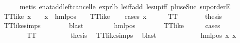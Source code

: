 \begin{isabellebody}
\ \ \ \ \isamarkupfalse%
\ {\isacharparenleft}{\kern0pt}metis\ enat{\isacharunderscore}{\kern0pt}add{\isacharunderscore}{\kern0pt}left{\isacharunderscore}{\kern0pt}cancel{\isacharunderscore}{\kern0pt}le\ expr{\isacharunderscore}{\kern0pt}{}{\isacharunderscore}{\kern0pt}lb\ le{\isacharunderscore}{\kern0pt}iff{\isacharunderscore}{\kern0pt}add\ le{\isacharunderscore}{\kern0pt}sup{\isacharunderscore}{\kern0pt}iff\ plus{\isacharunderscore}{\kern0pt}{}{\isacharunderscore}{\kern0pt}eSuc{\isacharparenleft}{\kern0pt}{}{\isacharparenright}{\kern0pt}\ sup{\isachardot}{\kern0pt}orderE{\isacharparenright}{\kern0pt}\isanewline
\ \ \isamarkupfalse%
\ {\isachardoublequoteopen}TT{\isacharunderscore}{\kern0pt}like\ x\ {\isasymor}\ {\isacharparenleft}{\kern0pt}{\isasymexists}{\isasymalpha}\ {\isasymchi}{\isachardot}{\kern0pt}\ x\ {\isacharequal}{\kern0pt}\ hml{\isacharunderscore}{\kern0pt}pos\ {\isasymalpha}\ {\isasymchi}\ {\isasymand}\ TT{\isacharunderscore}{\kern0pt}like\ {\isasymchi}{\isacharparenright}{\kern0pt}{\isachardoublequoteclose}\isanewline
\ \ \isamarkupfalse%
{\isacharparenleft}{\kern0pt}cases\ x{\isacharparenright}{\kern0pt}\isanewline
\ \ \ \ \isamarkupfalse%
\ TT\isanewline
\ \ \ \ \isamarkupfalse%
\ \isamarkupfalse%
\ {\isacharquery}{\kern0pt}thesis\ \isamarkupfalse%
\ TT{\isacharunderscore}{\kern0pt}like{\isachardot}{\kern0pt}simps\isanewline
\ \ \ \ \ \ \isamarkupfalse%
\ blast\isanewline
\ \ \isamarkupfalse%
\isanewline
\ \ \ \ \isamarkupfalse%
\ {\isacharparenleft}{\kern0pt}hml{\isacharunderscore}{\kern0pt}pos\ {\isasymalpha}\ {\isasympsi}{\isacharparenright}{\kern0pt}\isanewline
\ \ \ \ \isamarkupfalse%
\ {\isachardoublequoteopen}TT{\isacharunderscore}{\kern0pt}like\ {\isasympsi}{\isachardoublequoteclose}\isanewline
\ \ \ \ \isamarkupfalse%
{\isacharparenleft}{\kern0pt}cases\ {\isasympsi}{\isacharparenright}{\kern0pt}\isanewline
\ \ \ \ \ \ \isamarkupfalse%
\ TT\isanewline
\ \ \ \ \ \ \isamarkupfalse%
\ \isamarkupfalse%
\ {\isacharquery}{\kern0pt}thesis\ \isamarkupfalse%
\ TT{\isacharunderscore}{\kern0pt}like{\isachardot}{\kern0pt}simps\ \isamarkupfalse%
\ blast\isanewline
\ \ \ \ \isamarkupfalse%
\isanewline
\ \ \ \ \ \ \isamarkupfalse%
\ {\isacharparenleft}{\kern0pt}hml{\isacharunderscore}{\kern0pt}pos\ x{}{}\ x{}{}{\isacharparenright}{\kern0pt}\isanewline

\end{isabellebody}
